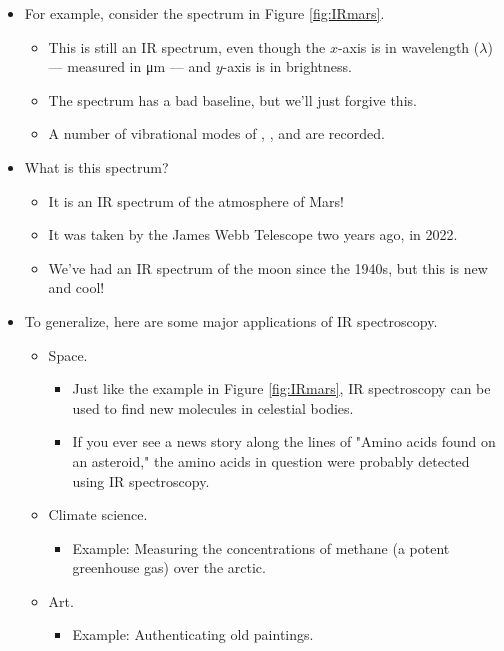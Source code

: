 \documentclass[../notes.tex]{subfiles}
\begin{document}
\begin{itemize}
\begin{itemize}
        \item For example, consider the spectrum in Figure \ref{fig:IRmars}.
        \begin{itemize}
            \item This is still an IR spectrum, even though the $x$-axis is in wavelength ($\lambda$) --- measured in \si{\micro\meter} --- and $y$-axis is in brightness.
            \item The spectrum has a bad baseline, but we'll just forgive this.
            \item A number of vibrational modes of , , and  are recorded.
        \end{itemize}
        \item What is this spectrum?
        \begin{itemize}
            \item It is an IR spectrum of the atmosphere of Mars!
            \item It was taken by the James Webb Telescope two years ago, in 2022.
            \item We've had an IR spectrum of the moon since the 1940s, but this is new and cool!
        \end{itemize}
        \item To generalize, here are some major applications of IR spectroscopy.
        \begin{itemize}
            \item Space.
            \begin{itemize}
                \item Just like the example in Figure \ref{fig:IRmars}, IR spectroscopy can be used to find new molecules in celestial bodies.
                \item If you ever see a news story along the lines of "Amino acids found on an asteroid," the amino acids in question were probably detected using IR spectroscopy.
            \end{itemize}
            \item Climate science.
            \begin{itemize}
                \item Example: Measuring the concentrations of methane (a potent greenhouse gas) over the arctic.
            \end{itemize}
            \item Art.
            \begin{itemize}
                \item Example: Authenticating old paintings.

\end{itemize}
\end{itemize}
\end{itemize}
\end{itemize}
\end{document}
